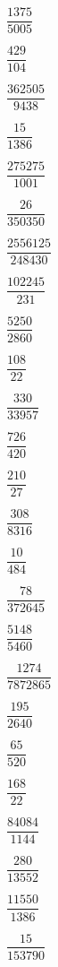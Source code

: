 {{\item$\dfrac{1375}{5005}$

\item$\dfrac{429}{104}$

\item$\dfrac{362505}{9438}$

\item$\dfrac{15}{1386}$

\item$\dfrac{275275}{1001}$

\item$\dfrac{26}{350350}$

\item$\dfrac{2556125}{248430}$

\item$\dfrac{102245}{231}$

\item$\dfrac{5250}{2860}$

\item$\dfrac{108}{22}$

\item$\dfrac{330}{33957}$

\item$\dfrac{726}{420}$

\item$\dfrac{210}{27}$

\item$\dfrac{308}{8316}$

\item$\dfrac{10}{484}$

\item$\dfrac{78}{372645}$

\item$\dfrac{5148}{5460}$

\item$\dfrac{1274}{7872865}$

\item$\dfrac{195}{2640}$

\item$\dfrac{65}{520}$

\item$\dfrac{168}{22}$

\item$\dfrac{84084}{1144}$

\item$\dfrac{280}{13552}$

\item$\dfrac{11550}{1386}$

\item$\dfrac{15}{153790}$

}}
